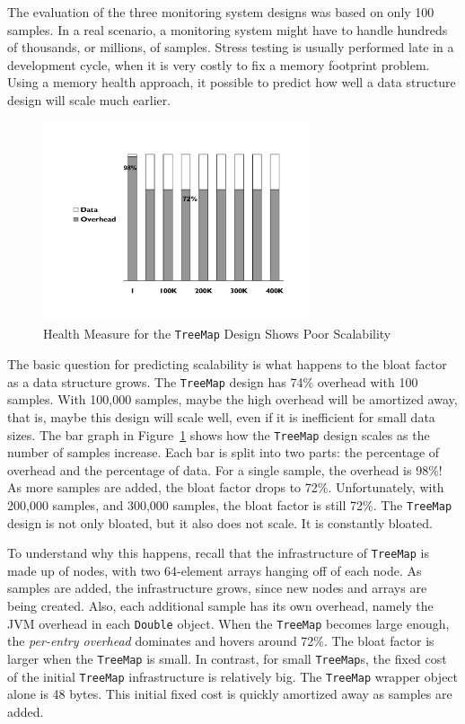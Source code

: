 The evaluation of the three monitoring system designs was based on only 100 samples. In a real scenario, a monitoring system might have to handle hundreds of thousands, or millions, of samples. Stress testing is usually performed late in a development cycle, when it is very costly to fix a memory footprint problem. Using a memory health approach, it possible to predict how well a data structure design will scale much earlier.
 
\begin{figure}
  \centering
   \includegraphics[width=0.7\textwidth]{part1/Figures/memoryhealth/scalable-health-treemap}
  \caption{Health Measure for the \texttt{TreeMap} Design Shows Poor Scalability}
  \label{fig:scalable-health-treemap}
\end{figure}
The basic question for predicting scalability is what happens to the bloat factor as a data structure grows. The \texttt{TreeMap} design has 74\% overhead with 100 samples. With 100,000 samples, maybe the high overhead will be amortized away, that is, maybe this design will scale well, even if it is inefficient for small data sizes. The bar graph in Figure~\ref{fig:scalable-health-treemap} shows how the \texttt{TreeMap} design scales as the number of samples increase. Each bar is split into two parts: the percentage of overhead and the percentage of data. For a single sample, the overhead is 98\%! As more samples are added, the bloat factor drops to 72\%. Unfortunately, with 200,000 samples, and 300,000 samples, the bloat factor is still 72\%. The \texttt{TreeMap} design is not only bloated, but it also does not scale. It is constantly bloated.

To understand why this happens, recall that the infrastructure of \texttt{TreeMap} is made up of nodes, with two 64-element arrays hanging off of each node. As samples are added, the infrastructure grows, since new nodes and arrays are being created. Also, each additional sample has its own overhead, namely the JVM overhead in each \texttt{Double} object. When the \texttt{TreeMap} becomes large enough, the \textit{per-entry overhead} dominates and hovers around 72\%. The bloat factor is larger when the \texttt{TreeMap} is small. In contrast, for small \texttt{TreeMap}s, the fixed cost of the initial \texttt{TreeMap} infrastructure is relatively big. The \texttt{TreeMap} wrapper object alone is 48 bytes. This initial fixed cost is quickly amortized away as samples are added. 

